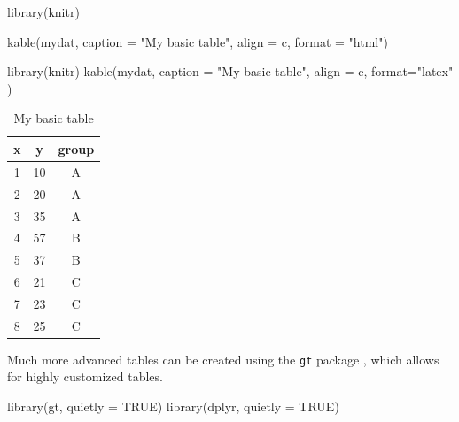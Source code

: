 \documentclass[
]{article}
\newenvironment{Shaded}{\begin{snugshade}}{\end{snugshade}}
\newcommand{\AttributeTok}[1]{\textcolor[rgb]{0.77,0.63,0.00}{#1}}
\newcommand{\ConstantTok}[1]{\textcolor[rgb]{0.00,0.00,0.00}{#1}}
\newcommand{\FunctionTok}[1]{\textcolor[rgb]{0.00,0.00,0.00}{#1}}
\newcommand{\NormalTok}[1]{#1}
\newcommand{\StringTok}[1]{\textcolor[rgb]{0.31,0.60,0.02}{#1}}
\begin{document}
\begin{Shaded}
\begin{Highlighting}[]
\FunctionTok{library}\NormalTok{(knitr)}

\FunctionTok{kable}\NormalTok{(mydat,}
      \AttributeTok{caption =} \StringTok{"My basic table"}\NormalTok{,}
      \AttributeTok{align =} \StringTok{\textquotesingle{}c\textquotesingle{}}\NormalTok{,  }
      \AttributeTok{format =} \StringTok{"html"}\NormalTok{)}
\end{Highlighting}
\end{Shaded}

\begin{Shaded}
\begin{Highlighting}[]
\FunctionTok{library}\NormalTok{(knitr)}
\FunctionTok{kable}\NormalTok{(mydat,}
      \AttributeTok{caption =} \StringTok{"My basic table"}\NormalTok{,}
      \AttributeTok{align =} \StringTok{\textquotesingle{}c\textquotesingle{}}\NormalTok{,  }
      \AttributeTok{format=}\StringTok{"latex"}\NormalTok{  )}
\end{Highlighting}
\end{Shaded}

\begin{table}

\caption{\label{tab:unnamed-chunk-46}My basic table}
\centering
\begin{tabular}[t]{c|c|c}
\hline
x & y & group\\
\hline
1 & 10 & A\\
\hline
2 & 20 & A\\
\hline
3 & 35 & A\\
\hline
4 & 57 & B\\
\hline
5 & 37 & B\\
\hline
6 & 21 & C\\
\hline
7 & 23 & C\\
\hline
8 & 25 & C\\
\hline
\end{tabular}
\end{table}

Much more advanced tables can be created using the \texttt{gt} package \citet{GT},
which allows for highly customized tables.

\begin{Shaded}
\begin{Highlighting}[]
\FunctionTok{library}\NormalTok{(gt, }
        \AttributeTok{quietly =} \ConstantTok{TRUE}\NormalTok{)}
\FunctionTok{library}\NormalTok{(dplyr,}
        \AttributeTok{quietly =} \ConstantTok{TRUE}\NormalTok{)}
\end{Highlighting}
\end{Shaded}
\end{document}
